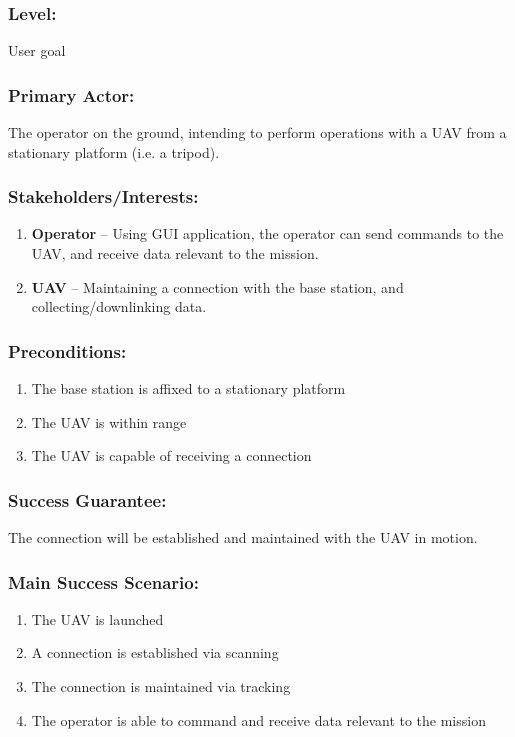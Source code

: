 \documentclass[ProductRequirements.tex]{subfiles}
\begin{document}
	\subsubsection*{Level:}
	User goal
	\subsubsection*{Primary Actor:}
	The operator on the ground, intending to perform operations with a UAV from a stationary platform (i.e. a tripod).
	\subsubsection*{Stakeholders/Interests:}
	\begin{enumerate}\itemsep1pt
		\item \textbf{Operator} -- Using GUI application, the operator can send commands to the UAV, and receive data relevant to the mission. 
		\item \textbf{UAV} -- Maintaining a connection with the base station, and collecting/downlinking data. 
	\end{enumerate}
	\subsubsection*{Preconditions:}
	\begin{enumerate}\itemsep1pt
		\item The base station is affixed to a stationary platform
		\item The UAV is within range
		\item The UAV is capable of receiving a connection
	\end{enumerate}
	\subsubsection*{Success Guarantee:}
	The connection will be established and maintained with the UAV in motion.
	\subsubsection*{Main Success Scenario:}
	\begin{enumerate}\itemsep1pt
		\item The UAV is launched
		\item A connection is established via scanning
		\item The connection is maintained via tracking
		\item The operator is able to command and receive data relevant to the mission 
	\end{enumerate}
\end{document}
